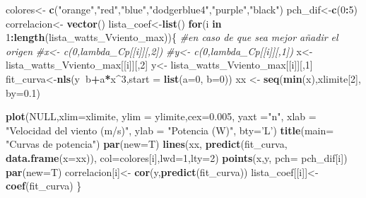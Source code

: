 \documentclass[]{article}
\newenvironment{Shaded}{\begin{snugshade}}{\end{snugshade}}
\newcommand{\KeywordTok}[1]{\textcolor[rgb]{0.13,0.29,0.53}{\textbf{#1}}}
\newcommand{\DataTypeTok}[1]{\textcolor[rgb]{0.13,0.29,0.53}{#1}}
\newcommand{\DecValTok}[1]{\textcolor[rgb]{0.00,0.00,0.81}{#1}}
\newcommand{\FloatTok}[1]{\textcolor[rgb]{0.00,0.00,0.81}{#1}}
\newcommand{\StringTok}[1]{\textcolor[rgb]{0.31,0.60,0.02}{#1}}
\newcommand{\CommentTok}[1]{\textcolor[rgb]{0.56,0.35,0.01}{\textit{#1}}}
\newcommand{\OtherTok}[1]{\textcolor[rgb]{0.56,0.35,0.01}{#1}}
\newcommand{\ControlFlowTok}[1]{\textcolor[rgb]{0.13,0.29,0.53}{\textbf{#1}}}
\newcommand{\OperatorTok}[1]{\textcolor[rgb]{0.81,0.36,0.00}{\textbf{#1}}}
\newcommand{\NormalTok}[1]{#1}
\begin{document}
\begin{Shaded}
\begin{Highlighting}[]
{{{{  
\NormalTok{  colores<-}\StringTok{ }\KeywordTok{c}\NormalTok{(}\StringTok{"orange"}\NormalTok{,}\StringTok{"red"}\NormalTok{,}\StringTok{"blue"}\NormalTok{,}\StringTok{"dodgerblue4"}\NormalTok{,}\StringTok{"purple"}\NormalTok{,}\StringTok{"black"}\NormalTok{)}
\NormalTok{  pch_dif<-}\KeywordTok{c}\NormalTok{(}\DecValTok{0}\OperatorTok{:}\DecValTok{5}\NormalTok{)}
\NormalTok{  correlacion<-}\StringTok{ }\KeywordTok{vector}\NormalTok{()}
\NormalTok{  lista_coef<-}\KeywordTok{list}\NormalTok{()}
  \ControlFlowTok{for}\NormalTok{(i }\ControlFlowTok{in} \DecValTok{1}\OperatorTok{:}\KeywordTok{length}\NormalTok{(lista_watts_Vviento_max))\{}
    \CommentTok{#en caso de que sea mejor añadir el origen}
    \CommentTok{#x<- c(0,lambda_Cp[[i]][,2])}
    \CommentTok{#y<- c(0,lambda_Cp[[i]][,1])}
\NormalTok{    x<-}\StringTok{ }\NormalTok{lista_watts_Vviento_max[[i]][,}\DecValTok{2}\NormalTok{]}
\NormalTok{    y<-}\StringTok{ }\NormalTok{lista_watts_Vviento_max[[i]][,}\DecValTok{1}\NormalTok{]}
\NormalTok{    fit_curva<-}\KeywordTok{nls}\NormalTok{(y}\OperatorTok{~}\NormalTok{b}\OperatorTok{+}\NormalTok{a}\OperatorTok{*}\NormalTok{x}\OperatorTok{^}\DecValTok{3}\NormalTok{,}\DataTypeTok{start =} \KeywordTok{list}\NormalTok{(}\DataTypeTok{a=}\DecValTok{0}\NormalTok{, }\DataTypeTok{b=}\DecValTok{0}\NormalTok{))}
\NormalTok{    xx <-}\StringTok{ }\KeywordTok{seq}\NormalTok{(}\KeywordTok{min}\NormalTok{(x),xlimite[}\DecValTok{2}\NormalTok{], }\DataTypeTok{by=}\FloatTok{0.1}\NormalTok{)}
    
    \KeywordTok{plot}\NormalTok{(}\OtherTok{NULL}\NormalTok{,}\DataTypeTok{xlim=}\NormalTok{xlimite,}
         \DataTypeTok{ylim =}\NormalTok{ ylimite,}\DataTypeTok{cex=}\FloatTok{0.005}\NormalTok{, }\DataTypeTok{yaxt =}\StringTok{"n"}\NormalTok{,}
         \DataTypeTok{xlab =} \StringTok{"Velocidad del viento (m/s)"}\NormalTok{, }\DataTypeTok{ylab =} \StringTok{"Potencia (W)"}\NormalTok{, }\DataTypeTok{bty=}\StringTok{'L'}\NormalTok{)}
    \KeywordTok{title}\NormalTok{(}\DataTypeTok{main=} \StringTok{"Curvas de potencia"}\NormalTok{)}
    \KeywordTok{par}\NormalTok{(}\DataTypeTok{new=}\NormalTok{T)}
    \KeywordTok{lines}\NormalTok{(xx, }\KeywordTok{predict}\NormalTok{(fit_curva, }\KeywordTok{data.frame}\NormalTok{(}\DataTypeTok{x=}\NormalTok{xx)), }\DataTypeTok{col=}\NormalTok{colores[i],}\DataTypeTok{lwd=}\DecValTok{1}\NormalTok{,}\DataTypeTok{lty=}\DecValTok{2}\NormalTok{)}
    \KeywordTok{points}\NormalTok{(x,y, }\DataTypeTok{pch=}\NormalTok{ pch_dif[i])}
    \KeywordTok{par}\NormalTok{(}\DataTypeTok{new=}\NormalTok{T)}
\NormalTok{    correlacion[i]<-}\StringTok{ }\KeywordTok{cor}\NormalTok{(y,}\KeywordTok{predict}\NormalTok{(fit_curva))}
\NormalTok{    lista_coef[[i]]<-}\StringTok{ }\KeywordTok{coef}\NormalTok{(fit_curva)}
\NormalTok{  \}}
  
}}}}
\end{Highlighting}
\end{Shaded}
\end{document}
